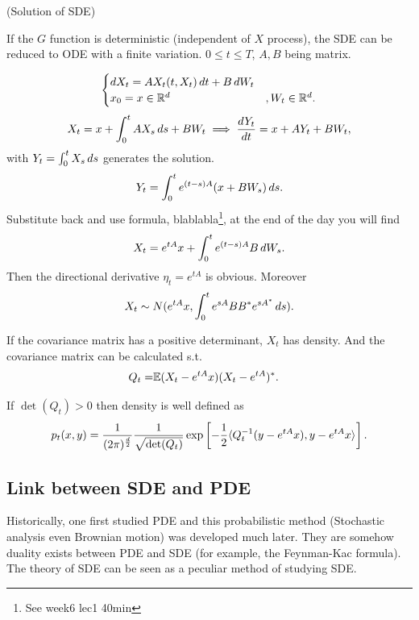 \begin{example}{(Solution of SDE)}\label{example: OUprocess}

If the $G$ function is deterministic (independent of $X$ process), the SDE can be reduced to ODE with a finite variation. $0\leq t\leq T$, $A,B$ being matrix.

\begin{equation*}
    \begin{cases}
    \mathop{}\!d X_t = A X_t(t,X_t) \mathop{}\!d t + B \mathop{}\!d W_t\\
    x_0= x \in \mathbb{R}^d &, W_t\in \mathbb{R}^d.
    \end{cases}
\end{equation*}
\begin{align*}
    X_t = x + \int_0^t A X_s \mathop{}\!d s+ B W_t \implies \frac{\mathop{}\!d Y_t}{\mathop{}\!d t} = x + A Y_t+ B W_t,
\end{align*} 
with $Y_t = \int_0^t X_s \mathop{}\!d s$ generates the solution.
\begin{equation*}
    Y_t = \int_0^t e^{(t-s)A} (x+ BW_s) \mathop{}\!d s.
\end{equation*}
Substitute back and use \ito formula, blablabla\footnote{See week6 lec1 40min}, at the end of the day you will find
\begin{equation*}
    X_t = e^{tA}x + \int_0^t e^{(t-s)A}B \mathop{}\!d W_s.
\end{equation*} Then the directional derivative $\eta_t = e^{tA}$ is obvious. Moreover
\begin{equation*}
    X_t \sim N(e^{tA}x, \int_0^t e^{sA} BB^* e^{sA^*} \mathop{}\!d s).
\end{equation*}

If the covariance matrix has a positive determinant, $X_t$ has density. And the covariance matrix can be calculated s.t.
\begin{align*}
    Q_t =& \mathbb{E}(X_t - e^{tA}x)(X_t - e^{tA})^*.
\end{align*}

If $\det(Q_t) >0$ then density is well defined as
\begin{equation*}
    p_t(x,y) = \frac{1}{(2\pi)^\frac{d}{2}}\frac{1}{\sqrt{\det(Q_t)}} \exp\left[-\frac{1}{2} \langle{Q_t^{-1}(y- e^{t A}x), y- e^{t A}x} \rangle_{} \right].
\end{equation*}
\end{example}


\subsection{Link between SDE and PDE}
Historically, one first studied PDE and this probabilistic method (Stochastic analysis even Brownian motion) was developed much later. They are somehow duality exists between PDE and SDE (for example, the Feynman-Kac formula). The theory of SDE can be seen as a peculiar method of studying SDE. 

